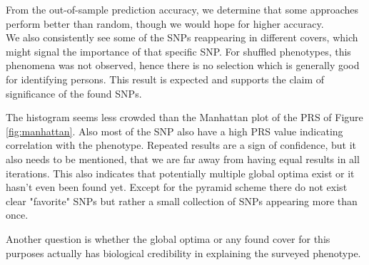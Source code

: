 \documentclass[letterpaper, 11pt]{article}
\begin{document}
\begin{figure} [h] 
\end{figure}
From the out-of-sample prediction accuracy, we determine that some approaches perform better than random, though we would hope for higher accuracy. \\

We also consistently see some of the SNPs reappearing in different covers, which might signal the importance of that specific SNP. For shuffled phenotypes, this phenomena was not observed, hence there is no selection which is generally good for identifying persons. 
This result is expected and supports the claim of significance of the found SNPs.

The histogram seems less crowded than the Manhattan plot of the PRS of Figure \ref{fig:manhattan}. Also most of the SNP also have a high PRS value indicating correlation with the phenotype. Repeated results are a sign of confidence, but it also needs to be mentioned, that we are far away from having equal results in all iterations. This also indicates that potentially multiple global optima exist or it hasn't even been found yet.  Except for  the pyramid scheme there do not exist clear "favorite" SNPs but rather a small collection of SNPs appearing more than once.

Another question is whether the global optima or any found cover for this purposes actually has biological credibility in explaining the surveyed phenotype. 
\end{document}
